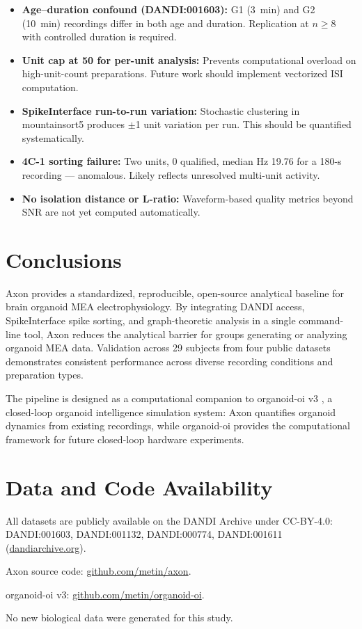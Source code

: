 \documentclass[11pt,a4paper]{article}
\begin{document}
\begin{itemize}
\item \textbf{Age--duration confound (DANDI:001603):} G1 (3~min) and G2 (10~min) 
recordings differ in both age and duration. Replication at $n \geq 8$ with 
controlled duration is required.
\item \textbf{Unit cap at 50 for per-unit analysis:} Prevents computational overload 
on high-unit-count preparations. Future work should implement vectorized ISI 
computation.
\item \textbf{SpikeInterface run-to-run variation:} Stochastic clustering in 
mountainsort5 produces $\pm$1 unit variation per run. This should be 
quantified systematically.
\item \textbf{4C-1 sorting failure:} Two units, 0 qualified, median Hz 19.76 for 
a 180-s recording --- anomalous. Likely reflects unresolved multi-unit activity.
\item \textbf{No isolation distance or L-ratio:} Waveform-based quality metrics 
beyond SNR are not yet computed automatically.
\end{itemize}

\section{Conclusions}

Axon provides a standardized, reproducible, open-source analytical baseline for 
brain organoid MEA electrophysiology. By integrating DANDI access, SpikeInterface 
spike sorting, and graph-theoretic analysis in a single command-line tool, Axon 
reduces the analytical barrier for groups generating or analyzing organoid MEA data. 
Validation across 29 subjects from four public datasets demonstrates consistent 
performance across diverse recording conditions and preparation types.

The pipeline is designed as a computational companion to organoid-oi v3 
\citep{metin2026oi}, a closed-loop organoid intelligence simulation system: Axon 
quantifies organoid dynamics from existing recordings, while organoid-oi provides 
the computational framework for future closed-loop hardware experiments.

\section*{Data and Code Availability}

All datasets are publicly available on the DANDI Archive under CC-BY-4.0:
DANDI:001603, DANDI:001132, DANDI:000774, DANDI:001611 
(\href{https://dandiarchive.org}{dandiarchive.org}).

Axon source code: \href{https://github.com/metin/axon}{github.com/metin/axon}.

organoid-oi v3: 
\href{https://github.com/metin/organoid-oi}{github.com/metin/organoid-oi}.

No new biological data were generated for this study.



\end{document}

